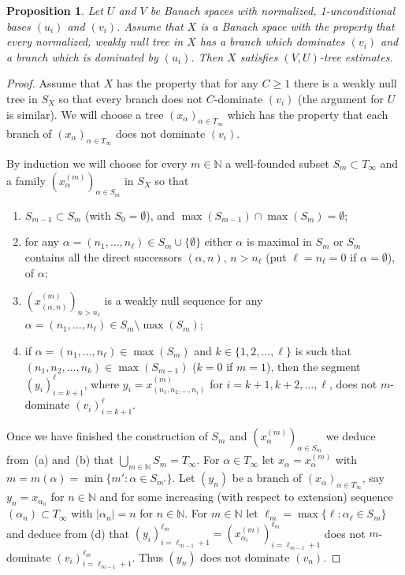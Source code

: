 \documentclass[11pt,leqno]{amsart}
\newtheorem{prop}[thm]{Proposition}
\theoremstyle{definition}
\newcommand{\N}{\mathbb{N}}
\begin{document}
\begin{prop}\label{P:1.2a}
  Let $U$ and $V$ be Banach spaces with normalized, 1-unconditional
  bases $(u_i)$ and $(v_i)$. Assume that $X$ is a Banach space with
  the property that every normalized, weakly null tree in $X$ has a
  branch which dominates $(v_i)$ and a branch which is dominated by
  $(u_i)$. Then $X$ satisfies $(V,U)$-tree estimates.
\end{prop}
\begin{proof}
  Assume that $X$ has the property
  that for any $C\ge 1$ there is a weakly null tree in
  $S_X$ so that every branch  does not $C$-dominate $(v_i)$ (the
  argument for $U$ is similar). We will choose a tree
  $(x_\alpha)_{\alpha\in T_\infty}$
  which has the property that each branch of $(x_\alpha)_{\alpha\in
  T_\infty}$ does not dominate $(v_i)$.

  
  By induction we will choose for every $m\in\N$ a well-founded subset
  $S_m\subset T_\infty$
  and a family $(x_\alpha^{(m)})_{\alpha\in S_m}$ in $S_X$ so that
  \begin{enumerate}
  \item[a)]$S_{m-1}\subset S_m$ (with $S_0=\emptyset$), and
    $\max(S_{m-1})\cap\max(S_m)=\emptyset$;
  \item[b)] for any $\alpha=(n_1,\ldots,n_\ell)\in
  S_m\cup\{\emptyset\}$ either $\alpha$ is maximal in $S_m$ or  $S_m$
  contains all the direct successors $(\alpha,n)$, $n>n_\ell$ (put
  $\ell=n_\ell=0$ if $\alpha=\emptyset$), of $\alpha$;
  \item[c)] $(x^{(m)}_{(\alpha,n)})_{n>n_\ell}$ is a weakly null sequence
    for any $\alpha=(n_1,\ldots,n_\ell)\in S_m\setminus \max(S_m)$;
  \item[d)] if $\alpha=(n_1,\ldots,n_\ell)\in \max(S_m)$
    and $k\in\{1,2,\dots,\ell\}$ is such that
    $(n_1,n_2,\ldots,n_k)\in\max(S_{m-1})$ ($k=0$ if $m=1$), then the
    segment $(y_i)_{i=k+1}^\ell$, where
    $y_i=x^{(m)}_{(n_1,n_2,\ldots,n_i)}$ for $i=k+1,k+2,\ldots,\ell$,
    does not $m$-dominate $(v_i)_{i=k+1}^\ell$.
  \end{enumerate}
  Once we have finished the construction of $S_m$ and
  $(x^{(m)}_\alpha)_{\alpha\in S_m}$ we
  deduce from~(a) and~(b) that $\bigcup_{m\in\N} S_m=T_\infty$.
  For $\alpha\in T_\infty$ let $x_\alpha=x^{(m)}_\alpha$ with
  $m=m(\alpha)=\min\{m': \alpha\in S_{m'}\}$.
  Let $(y_n)$ be a branch of $(x_\alpha)_{\alpha\in T_\infty}$, say
  $y_n=x_{\alpha_n}$ for $n\in\N$ and for
  some increasing (with respect to extension) sequence
  $(\alpha_n)\subset T_\infty$ with $|\alpha_n|=n$ for $n\in\N$.
  For $m\in\N$ let $\ell_m=\max\{ \ell: \alpha_\ell\in S_m\}$ and deduce
  from (d) that
  $(y_i)_{i=\ell_{m-1}+1}^{\ell_m}= (x^{(m)}_{\alpha_i}
  )_{i=\ell_{m-1}+1}^{\ell_m}$
  does not  $m$-dominate $(v_i)_{i=\ell_{m-1}+1}^{\ell_m}$. Thus $(y_n)$
  does not dominate $(v_n)$.
  

\end{proof}
\end{document}
